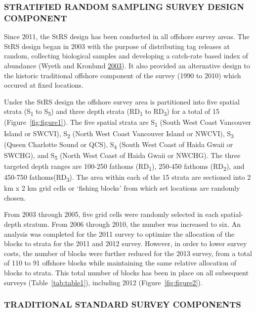 \documentclass[12pt]{article}\usepackage[]{graphicx}\usepackage[]{color}
\begin{document}
\hypertarget{stratified-random-sampling-survey-design-component}{%
\subsubsection{STRATIFIED RANDOM SAMPLING SURVEY DESIGN COMPONENT}\label{stratified-random-sampling-survey-design-component}}

Since 2011, the StRS design has been conducted in all offshore survey areas. The StRS design began in 2003 with the purpose of distributing tag releases at random, collecting biological samples and developing a catch-rate based index of abundance (Wyeth and Kronlund \protect\hyperlink{ref-Wyeth2003}{2003}). It also provided an alternative design to the historic traditional offshore component of the survey (1990 to 2010) which occured at fixed locations.

Under the StRS design the offshore survey area is partitioned into five spatial strata (S\textsubscript{1} to S\textsubscript{5}) and three depth strata (RD\textsubscript{1} to RD\textsubscript{3}) for a total of 15 (Figure~\ref{fig:figure1}). The five spatial strata are S\textsubscript{1} (South West Coast Vancouver Island or SWCVI), S\textsubscript{2} (North West Coast Vancouver Island or NWCVI), S\textsubscript{3} (Queen Charlotte Sound or QCS), S\textsubscript{4} (South West Coast of Haida Gwaii or SWCHG), and S\textsubscript{5} (North West Coast of Haida Gwaii or NWCHG). The three targeted depth ranges are 100-250 fathoms (RD\textsubscript{1}), 250-450 fathoms (RD\textsubscript{2}), and 450-750 fathoms(RD\textsubscript{3}). The area within each of the 15 strata are sectioned into 2 km x 2 km grid cells or `fishing blocks' from which set locations are randomly chosen.

From 2003 through 2005, five grid cells were randomly selected in each spatial-depth stratum. From 2006 through 2010, the number was increased to six. An analysis was completed for the 2011 survey to optimize the allocation of the blocks to strata for the 2011 and 2012 survey. However, in order to lower survey costs, the number of blocks were further reduced for the 2013 survey, from a total of 110 to 91 offshore blocks while maintaining the same relative allocation of blocks to strata. This total number of blocks has been in place on all subsequent surveys (Table~\ref{tab:table1}), including 2012 (Figure~\ref{fig:figure2}).

\hypertarget{traditional-standard-survey-components}{%
\subsubsection{TRADITIONAL STANDARD SURVEY COMPONENTS}\label{traditional-standard-survey-components}}
\end{document}

